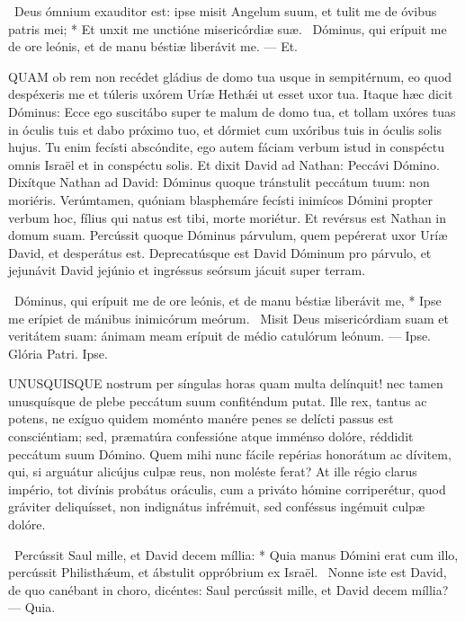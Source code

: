 \R\ Deus ómnium exauditor est: ipse misit Angelum suum, et tulit me de óvibus patris mei; * Et unxit me unctióne misericórdiæ suæ. \V\ Dóminus, qui erípuit me de ore leónis, et de manu béstiæ liberávit me. --- Et.


\lettrine[lines=2]{Q}{UAM} ob rem non recédet gládius de domo tua usque in sempitérnum, eo quod despéxeris me et túleris uxórem Uríæ Hethǽi ut esset uxor tua. Itaque hæc dicit Dóminus: Ecce ego suscitábo super te malum de domo tua, et tollam uxóres tuas in óculis tuis et dabo próximo tuo, et dórmiet cum uxóribus tuis in óculis solis hujus. Tu enim fecísti abscóndite, ego autem fáciam verbum istud in conspéctu omnis Israël et in conspéctu solis. Et dixit David ad Nathan: Peccávi Dómino. Dixítque Nathan ad David: Dóminus quoque tránstulit peccátum tuum: non moriéris. Verúmtamen, quóniam blasphemáre fecísti inimícos Dómini propter verbum hoc, fílius qui natus est tibi, morte moriétur. Et revérsus est Nathan in domum suam. Percússit quoque Dóminus párvulum, quem pepérerat uxor Uríæ David, et desperátus est. Deprecatúsque est David Dóminum pro párvulo, et jejunávit David jejúnio et ingréssus seórsum jácuit super terram.

\R\ Dóminus, qui erípuit me de ore leónis, et de manu béstiæ liberávit me, * Ipse me erípiet de mánibus inimicórum meórum. \V\ Misit Deus misericórdiam suam et veritátem suam: ánimam meam erípuit de médio catulórum leónum. --- Ipse. Glória Patri. Ipse.




\lettrine[lines=2]{U}{NUSQUISQUE} nostrum per síngulas horas quam multa delínquit! nec tamen unusquísque de plebe peccátum suum confiténdum putat. Ille rex, tantus ac potens, ne exíguo quidem moménto manére penes se delícti passus est consciéntiam; sed, præmatúra confessióne atque imménso dolóre, réddidit peccátum suum Dómino. Quem mihi nunc fácile repérias honorátum ac dívitem, qui, si arguátur alicújus culpæ reus, non moléste ferat? At ille régio clarus império, tot divínis probátus oráculis, cum a priváto hómine corriperétur, quod gráviter deliquísset, non indignátus infrémuit, sed conféssus ingémuit culpæ dolóre.

\R\ Percússit Saul mille, et David decem míllia: * Quia manus Dómini erat cum illo, percússit Philisthǽum, et ábstulit oppróbrium ex Israël. \V\ Nonne iste est David, de quo canébant in choro, dicéntes: Saul percússit mille, et David decem míllia? --- Quia.


